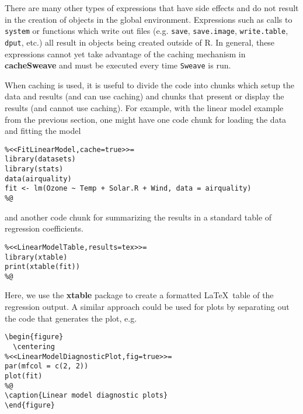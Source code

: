 \documentclass{article}
\newcommand{\proglang}{\textsf}
\newcommand{\code}{\texttt}
\newcommand{\pkg}{\textbf}
\begin{document}
There are many other types of expressions that have side effects and
do not result in the creation of objects in the global environment.
Expressions such as calls to \code{system} or functions which write
out files (e.g. \code{save}, \code{save.image}, \code{write.table},
\code{dput}, etc.) all result in objects being created outside of
\proglang{R}.  In general, these expressions cannot yet take advantage
of the caching mechanism in \pkg{cacheSweave} and must be executed
every time \code{Sweave} is run.

When caching is used, it is useful to divide the code into chunks
which setup the data and results (and can use caching) and chunks that
present or display the results (and cannot use caching).  For example,
with the linear model example from the previous section, one might
have one code chunk for loading the data and fitting the model
\begin{verbatim}
%<<FitLinearModel,cache=true>>=
library(datasets)
library(stats)
data(airquality)
fit <- lm(Ozone ~ Temp + Solar.R + Wind, data = airquality)
%@
\end{verbatim}
and another code chunk for summarizing the results in a standard table
of regression coefficients.
\begin{verbatim}
%<<LinearModelTable,results=tex>>=
library(xtable)
print(xtable(fit))
%@
\end{verbatim}
Here, we use the \pkg{xtable} package to create a formatted \LaTeX\
table of the regression output.  A similar approach could be used for
plots by separating out the code that generates the plot, e.g.
\begin{verbatim}
\begin{figure}
  \centering
%<<LinearModelDiagnosticPlot,fig=true>>=
par(mfcol = c(2, 2))
plot(fit)
%@
\caption{Linear model diagnostic plots}
\end{figure}
\end{verbatim}



\end{document}
